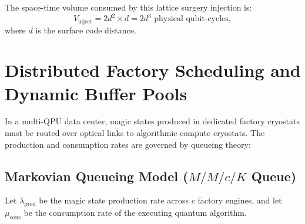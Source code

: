 The space-time volume consumed by this lattice surgery injection is:
\begin{equation}
    V_{\text{inject}} = 2 d^2 \times d = 2 d^3 \text{ physical qubit-cycles},
    \label{eq:space_time_volume_injection}
\end{equation}
where $d$ is the surface code distance.


\section{Distributed Factory Scheduling and Dynamic Buffer Pools}
\label{sec:factory_scheduling}

In a multi-QPU data center, magic states produced in dedicated factory cryostats must be routed over optical links to algorithmic compute cryostats. The production and consumption rates are governed by queueing theory:

\subsection{Markovian Queueing Model ($M/M/c/K$ Queue)}
Let $\lambda_{\text{prod}}$ be the magic state production rate across $c$ factory engines, and let $\mu_{\text{cons}}$ be the consumption rate of the executing quantum algorithm.

